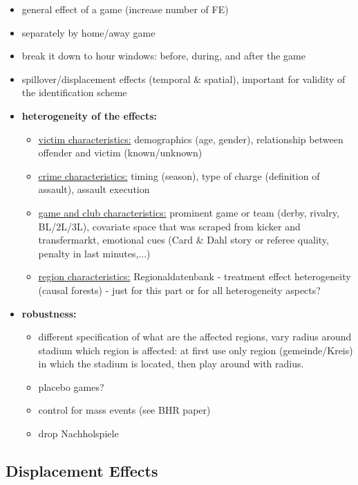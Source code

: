 \documentclass[11pt, a4paper, draft]{article} %
\begin{document}
\begin{itemize}
	\item general effect of a game (increase number of FE)
	\item separately by home/away game
	\item break it down to hour windows: before, during, and after the game
	\item spillover/displacement effects (temporal \& spatial), important for validity of the identification scheme
	\item \textbf{heterogeneity of the effects:}
	\begin{itemize}
		\item \underline{victim characteristics:} demographics (age, gender), relationship between offender and victim (known/unknown)
		\item \underline{crime characteristics:} timing (season), type of charge (definition of assault), assault execution
		\item \underline{game and club characteristics:} prominent game or team (derby, rivalry, BL/2L/3L), covariate space that was scraped from kicker and transfermarkt, emotional cues (Card \& Dahl story or referee quality, penalty in last minutes,...)
		\item \underline{region characteristics:} Regionaldatenbank - treatment effect heterogeneity (causal forests) - just for this part or for all heterogeneity aspects?
	\end{itemize}
	\item \textbf{robustness:}
	\begin{itemize}
		\item different specification of what are the affected regions, vary radius around stadium which region is affected: at first use only region (gemeinde/Kreis) in which the stadium is located, then play around with radius.

		\item placebo games?
		\item control for mass events (see BHR paper)
		\item drop Nachholspiele
	\end{itemize}
\end{itemize}













\newpage
\subsection{Displacement Effects}
\end{document}
